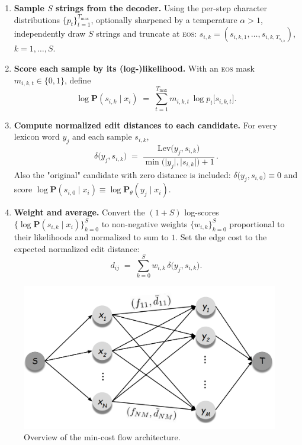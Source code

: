 \begin{enumerate}[leftmargin=2em]
\item \textbf{Sample $S$ strings from the decoder.}
Using the per-step character distributions $\{p_t\}_{t=1}^{T_{\max}}$, optionally sharpened by a temperature $\alpha>1$, independently draw $S$ strings and truncate at \textsc{eos}:
$s_{i,k}=(s_{i,k,1},\ldots,s_{i,k,T_{s_{i,k}}})$, $k=1,\ldots,S$.

\item \textbf{Score each sample by its (log-)likelihood.}
With an \textsc{eos} mask $m_{i,k,t}\in\{0,1\}$, define
\[
\log \mathbf{P}(s_{i,k}\!\mid x_i)
\;=\;
\sum_{t=1}^{T_{\max}} m_{i,k,t}\,\log p_t\!\bigl[s_{i,k,t}\bigr].
\]

\item \textbf{Compute normalized edit distances to each candidate.}
For every lexicon word $y_j$ and each sample $s_{i,k}$,
\[
\delta\bigl(y_j,s_{i,k}\bigr)
\;=\;
\frac{\mathrm{Lev}\bigl(y_j,s_{i,k}\bigr)}
     {\min\!\bigl(\lvert y_j\rvert,\lvert s_{i,k}\rvert\bigr)+1}\,.
\]
Also the "original" candidate with zero distance is included:
$\delta\bigl(y_j,s_{i,0}\bigr)\equiv 0$ and score
$\log \mathbf{P}(s_{i,0}\!\mid x_i)\equiv \log \mathbf{P}_{\theta}(y_j\!\mid x_i)$.

\item \textbf{Weight and average.}
Convert the $(1+S)$ log-scores
$\{\log \mathbf{P}(s_{i,k}\!\mid x_i)\}_{k=0}^{S}$
to non-negative weights $\{w_{i,k}\}_{k=0}^{S}$ proportional to their likelihoods and normalized to sum to $1$.
Set the edge cost to the expected normalized edit distance:
\[
d_{ij}
\;=\;
\sum_{k=0}^{S} w_{i,k}\,\delta\bigl(y_j,s_{i,k}\bigr).
\]
\end{enumerate}


\begin{figure}[H]
    \centering
    \includegraphics[width=1\textwidth]{Images/luo_flow.png} %
    \caption{Overview of the min-cost flow architecture.\protect\footnotemark}
    \label{fig:luo_flow}
\end{figure}

